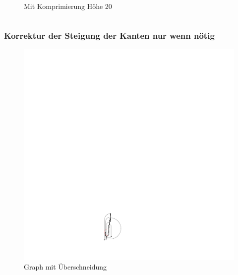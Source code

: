 \documentclass{beamer}
\begin{document}
\begin{frame}
\begin{columns}[b]
\begin{column}{5cm}
\begin{figure}[h]
  \caption{Mit Komprimierung Höhe 20}
  \label{fig:exampleAsmoothSimple}
\end{figure}
\end{column}
\end{columns}
\end{frame}

\begin{frame}
  \frametitle{ Korrektur der Steigung der Kanten nur wenn nötig}
\begin{figure}[h]
  \centering
  \includegraphics{hugeGraph/isntPlanar}
  \caption{Graph mit Überschneidung}
  \label{fig:exampleAsmoothSimple}
\end{figure}
\end{frame}
\end{document}
